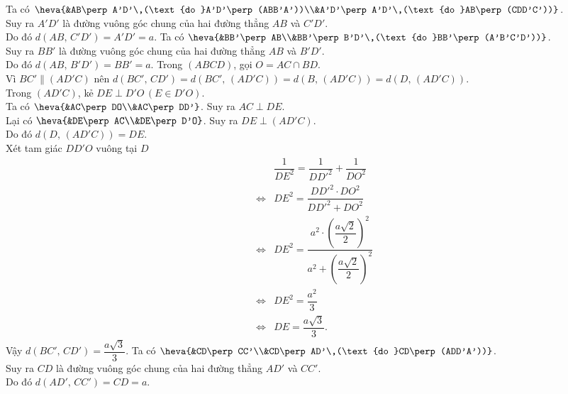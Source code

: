 \begin{ex}
{\begin{center}
	\end{center}
	\begin{itemchoice}
	\itemch Ta có $\heva{&AB\perp A'D'\,(\text{do }A'D'\perp (ABB'A'))\\&A'D'\perp A'D'\,(\text{do }AB\perp (CDD'C'))}$. \\
	Suy ra $A'D'$ là đường vuông góc chung của hai đường thẳng $AB$ và $C'D'$.\\
	Do đó $d(AB{,\,}C'D')=A'D'=a$.
	\itemch Ta có $\heva{&BB'\perp AB\\&BB'\perp B'D'\,(\text{do }BB'\perp (A'B'C'D'))}$. \\
	Suy ra $BB'$ là đường vuông góc chung của hai đường thẳng $AB$ và $B'D'$.\\
	Do đó $d(AB{,\,}B'D')=BB'=a$.
	\itemch Trong $(ABCD)$, gọi $O=AC\cap BD$.\\
	Vì $BC'\parallel (AD'C)$ nên $d(BC'{,\,}CD')=d(BC'{,\,}(AD'C))=d(B{,\,}(AD'C))=d(D{,\,}(AD'C))$.\\
	Trong $(AD'C)$, kẻ $DE\perp D'O\,(E\in D'O)$.\\
	Ta có $\heva{&AC\perp DO\\&AC\perp DD'}$. Suy ra $AC\perp DE$.\\
	Lại có $\heva{&DE\perp AC\\&DE\perp D'O}$. Suy ra $DE\perp (AD'C)$.\\
	Do đó $d(D{,\,}(AD'C))=DE$.\\
	Xét tam giác $DD'O$ vuông tại $D$
	\begin{eqnarray*}
&&\dfrac{1}{DE^2}=\dfrac{1}{DD'^2}+\dfrac{1}{DO^2}\\&\Leftrightarrow &DE^2=\dfrac{DD'^2\cdot DO^2}{DD'^2+DO^2}\\&\Leftrightarrow &DE^2=\dfrac{a^2\cdot \left(\dfrac{a\sqrt{2}}{2}\right)^2}{a^2+\left(\dfrac{a\sqrt{2}}{2}\right)^2}\\&\Leftrightarrow &DE^2=\dfrac{a^2}{3}\\&\Leftrightarrow &DE=\dfrac{a\sqrt{3}}{3}.
\end{eqnarray*}
	Vậy $d(BC'{,\,}CD')=\dfrac{a\sqrt{3}}{3}$.
	\itemch Ta có $\heva{&CD\perp CC'\\&CD\perp AD'\,(\text{do }CD\perp (ADD'A'))}$. \\
	Suy ra $CD$ là đường vuông góc chung của hai đường thẳng $AD'$ và $CC'$.\\
	Do đó $d(AD'{,\,}CC')=CD=a$.
\end{itemchoice}
	}
\end{ex}

